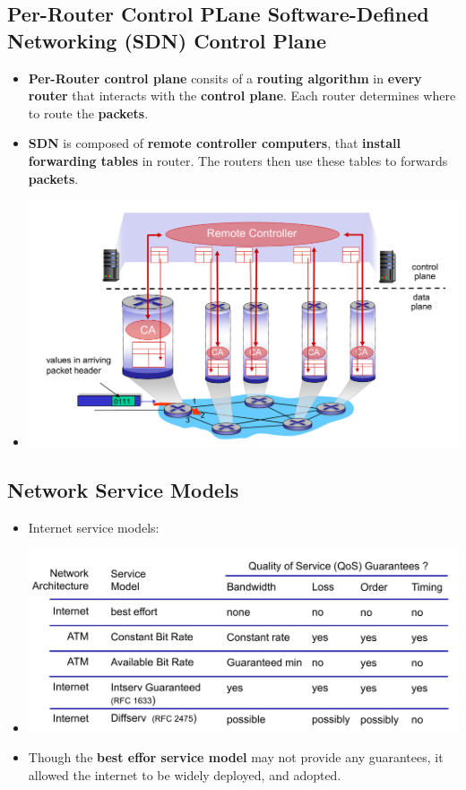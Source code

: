 \documentclass{article}
\begin{document}
    \subsection*{Per-Router Control PLane Software-Defined Networking (SDN) Control Plane}
    \begin{itemize}
        \item \textbf{Per-Router control plane} consits of a \textbf{routing algorithm} in \textbf{every router} that interacts with the \textbf{control plane}. Each router determines where to route the \textbf{packets}.
        \item \textbf{SDN} is composed of \textbf{remote controller computers}, that \textbf{install forwarding tables} in router. The routers then use these tables to forwards \textbf{packets}.
        \item[] \begin{center}
                    \includegraphics[width=\textwidth - 25pt]{images/Software-Defined-Networking.png}
                \end{center}
    \end{itemize}

    \subsection*{Network Service Models}
    \begin{itemize}
        \item Internet service models:
        \item[] \includegraphics[width=\textwidth - 25pt]{images/Network-Service-Models.png}
        \item Though the \textbf{best effor service model} may not provide any guarantees, it allowed the internet to be widely deployed, and adopted. 
    \end{itemize}
\end{document}
